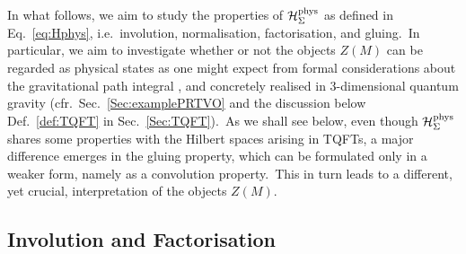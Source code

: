 \documentclass[11pt]{article}
\newcommand{\Hphys}{\mathcal{H}_{\Sigma}^{\rm phys}}
\theoremstyle{definition}
\numberwithin{equation}{section}
\begin{document}
In what follows, we aim to study the properties of $\Hphys$ as defined in Eq.~\eqref{eq:Hphys}, i.e.~involution, normalisation, factorisation, and gluing.~In particular, we aim to investigate whether or not the objects $Z(M)$ can be regarded as physical states as one might expect from formal considerations about the gravitational path integral \cite{Hartle_Hawking_1983,Halliwell:1990qr}, and concretely realised in 3-dimensional quantum gravity (cfr.~Sec.~\ref{Sec:examplePRTVO} and the discussion below Def.~\ref{def:TQFT} in Sec.~\ref{Sec:TQFT}).~As we shall see below, even though $\Hphys$ shares some properties with the Hilbert spaces arising in TQFTs, a major difference emerges in the gluing property, which can be formulated only in a weaker form, namely as a convolution property.~This in turn leads to a different, yet crucial, interpretation of the objects $Z(M)$.

\subsection{Involution and Factorisation}\label{Sec:HphysInvFact}
\end{document}
